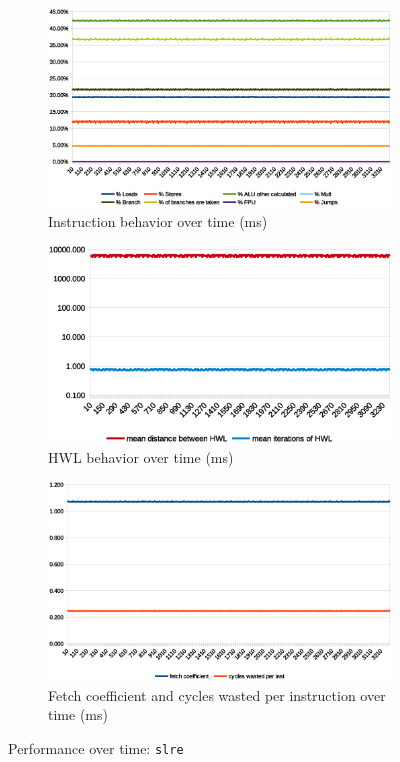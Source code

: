 \documentclass[../bachelor_paper.tex]{subfiles}
\begin{document}
\begin{figure}
    \begin{subfigure}{0.45\textwidth}
        \includegraphics[width=\textwidth]{img/graph/embench/slre_inst.eps}
        \caption{Instruction behavior over time (ms)}
    \end{subfigure}
    \begin{subfigure}{0.45\textwidth}
        \includegraphics[width=\textwidth]{img/graph/embench/slre_hwl.eps}
        \caption{\ac{HWL} behavior over time (ms)}
    \end{subfigure}
    \begin{subfigure}{0.45\textwidth}
        \includegraphics[width=\textwidth]{img/graph/embench/slre_fetch_waste.eps}
        \caption{Fetch coefficient and cycles wasted per instruction over time (ms)}
    \end{subfigure}
    \caption{Performance over time: \texttt{slre}}
\end{figure}
\end{document}
